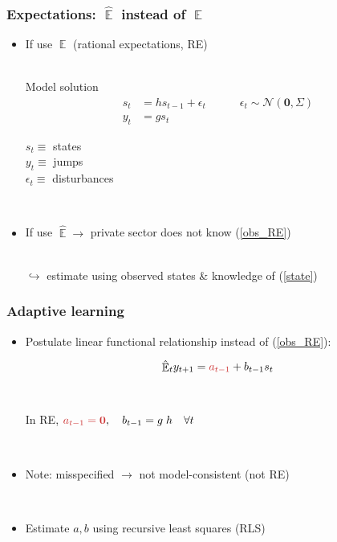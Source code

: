 \documentclass[10pt]{beamer}
\DeclareMathOperator{\E}{\mathbb{E}}
\begin{document}
\begin{frame}
	\frametitle{Expectations: $\hat{\E}$ instead of $\E$}

\begin{itemize}
\item If use $\E$ (rational expectations, RE) \\

\

Model solution 
 \begin{align}
 s_t & = h s_{t-1} + \epsilon_t \quad \quad \quad \epsilon_t \sim \mathcal{N}(\mathbf{0},\Sigma) \label{state} \\
 y_t & = g s_t \label{obs_RE}
 \end{align}


$s_t \equiv $ states \\
$y_t \equiv $ jumps \\
$\epsilon_t \equiv $ disturbances
\

\pause

\

\item If use $\hat{\E} \rightarrow$ private sector does not know (\ref{obs_RE}) \\

\

$\hookrightarrow$ estimate using observed states \& knowledge of (\ref{state})

\end{itemize}



\end{frame}

\begin{frame}
	\frametitle{Adaptive learning}
	\label{adaptive_learning}

\begin{itemize}
\item Postulate linear functional relationship instead of (\ref{obs_RE}):

\begin{equation}
\hat{\E}_t y_{t+1} = \textcolor{brownreddark}{a_{t-1}} + b_{t-1}s_t  \label{PLM_fcst_general}
\end{equation}

\

\pause

In RE, $\textcolor{brownreddark}{a_{t-1} = \mathbf{0}}, \quad b_{t-1} = g\;h \quad \forall t$

\

\pause
  


\item Note: \textcolor{brownreddark}{misspecified}	$\rightarrow$ not model-consistent (not RE) 

\

\pause


\item Estimate $a, b$ using recursive least squares (RLS)


\end{itemize}


\end{frame}
\end{document}
